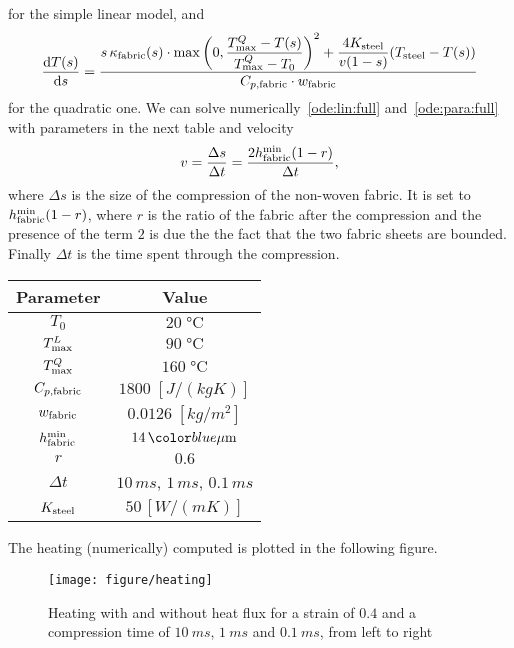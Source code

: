 for the simple linear model, and
\begin{equation}\label{ode:para:full}
   \dfrac{\mathrm{d}T(s)}{\mathrm{d}s} = \dfrac{s\,\kappa_{\mathrm{fabric}}(s)\cdot
   \max\left(0,\dfrac{{T_{\max}^Q}-T(s)}{{T_{\max}^Q}-T_0}\right)^2
   +\dfrac{4K_{\mathrm{steel}}}{v(1-s)}
  (T_{\mathrm{steel}}-T(s))}{C_{p,\textrm{fabric}}\cdot w_{\mathrm{fabric}}}
\end{equation}
for the quadratic one.
We can solve numerically~\eqref{ode:lin:full} and~\eqref{ode:para:full} with parameters in the next table and velocity
\[
   v = \dfrac{\Delta s}{\Delta t}=\dfrac{2h_{\mathrm{fabric}}^{\min} (1-r)}{\Delta t},
\]
where $\Delta s$ is the size of the compression of the non-woven fabric. It is set to $h_{\mathrm{fabric}}^{\min} (1-r)$, where $r$ is the ratio of the fabric after the compression and the presence of the term $2$ is due the the fact that the two fabric sheets are bounded. Finally $\Delta t$ is the time spent through the compression.
\begin{center}
  \begin{tabular}{|cc|}
    \hline
    Parameter & Value \\
    \hline
    $T_0$         & $20\;\unit{\celsius}$ \\
    ${T_{\max}^L}$      & $90\;\unit{\celsius}$ \\
    ${T_{\max}^Q}$      & $160\;\unit{\celsius}$ \\
    $C_{p,\textrm{fabric}}$   & $1800\;[\unit{J}/(\unit{kg K})]$ \\
    $w_{\mathrm{fabric}}$    & $0.0126\;[\unit{kg}/\unit{m}^2]$ \\
    $h_{\mathrm{fabric}}^{\min}$ & $14\,\unit{$\mu$m}$ \\
    $r$           & $0.6$ \\
    $\Delta t$    & $10\,\unit{ms}$, $1\,\unit{ms}$, $0.1\,\unit{ms}$ \\
    $K_{\mathrm{steel}}$     & $50\,[\unit{W}/(\unit{m K})]$ \\
    \hline
  \end{tabular}
\end{center}
The heating (numerically) computed is plotted in the following figure.

\begin{figure}[H]
  \begin{center}
    \texttt{[image: figure/heating]}
  \end{center}
  \caption{
  Heating with and without heat flux for a strain of $0.4$ and a compression time of $10 \ \unit{ms}$, $1 \ \unit{ms}$ and $0.1 \ \unit{ms}$, from left to right
  }
  \label{fig:heating}
\end{figure}
